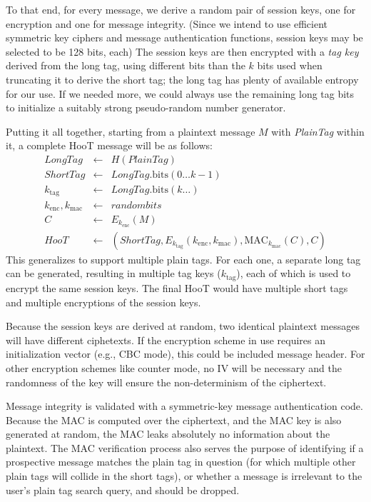 To that end, for every message, we derive a random pair of session keys, one for encryption and one for message integrity. (Since we intend to use efficient symmetric key ciphers and message authentication functions, session keys may be selected to be 128 bits, each) The session keys are then encrypted with a {\em tag key} derived from the long tag, using different bits than the $k$ bits used when truncating it to derive the short tag; the long tag has plenty of available entropy for our use. If we needed more, we could always use the remaining long tag bits to initialize a suitably strong pseudo-random number generator.

Putting it all together, starting from a plaintext message $M$ with {\em PlainTag} within it, a complete HooT message will be as follows:
%
\begin{eqnarray*}
\mathit{LongTag} & \leftarrow & H(\mathit{PlainTag}) \\
\mathit{ShortTag} & \leftarrow & \mathit{LongTag}.\mathrm{bits}(0 \ldots k-1) \\
k_{\mathrm{tag}} & \leftarrow & \mathit{LongTag}.\mathrm{bits}(k \ldots) \\
k_{\mathrm{enc}}, k_{\mathrm{mac}} & \leftarrow & \mathit{random bits} \\
C & \leftarrow & E_{k_{\mathrm{enc}}}(M) \\
\mathit{HooT}  & \leftarrow &  \left(\mathit{ShortTag}, E_{k_{\mathrm{tag}}} \left(k_{\mathrm{enc}}, k_{\mathrm{mac}}\right), \mathrm{MAC}_{k_{\mathrm{mac}}}(C), C\right)
\end{eqnarray*}
%
This generalizes to support multiple plain tags. For each one, a separate long tag can be generated, resulting in multiple tag keys ($k_\mathrm{tag}$), each of which is used to encrypt the same session keys. The final HooT would have multiple short tags and multiple encryptions of the session keys.

Because the session keys are derived at random, two identical plaintext messages will have different ciphetexts. If the encryption scheme in use requires an initialization vector (e.g., CBC mode), this could be included message header. For other encryption schemes like counter mode, no IV will be necessary and the randomness of the key will ensure the non-determinism of the ciphertext.

Message integrity is validated with a symmetric-key message authentication code. Because the MAC is computed over the ciphertext, and the MAC key is also generated at random, the MAC leaks absolutely no information about the plaintext. The MAC verification process also serves the purpose of identifying if a prospective message matches the plain tag in question (for which multiple other plain tags will collide in the short tags), or whether a message is irrelevant to the user's plain tag search query, and should be dropped.

